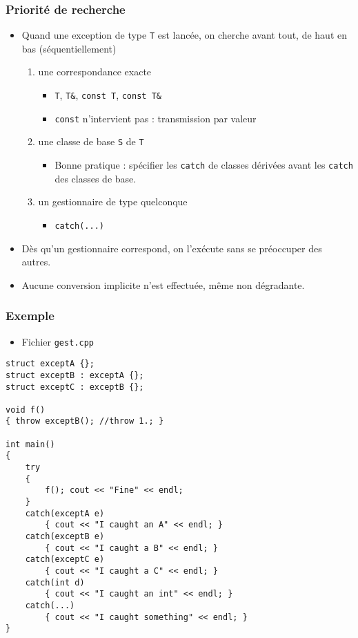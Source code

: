 \begin{frame}
\frametitle{Priorité de recherche}
\begin{itemize}[<+->]
\item Quand une exception de type \texttt{T} est lancée, on cherche avant tout, de haut en bas (séquentiellement)
	\begin{enumerate}
	\item une correspondance exacte
		\begin{itemize}
		\item \lstinline|T|, \lstinline|T&|, \lstinline|const T|, \lstinline|const T&|
		\item \lstinline|const| n'intervient pas : transmission par valeur
		\end{itemize}
	\item une classe de base \texttt{S} de \texttt{T}
		\begin{itemize}
		\item Bonne pratique : spécifier les \lstinline|catch| de classes dérivées avant les \lstinline|catch| des classes de base.
		\end{itemize}	
	\item un gestionnaire de type quelconque
		\begin{itemize}
		\item \lstinline|catch(...)|
		\end{itemize}
	\end{enumerate}
\item Dès qu'un gestionnaire correspond, on l'exécute sans se préoccuper des autres.
\item Aucune conversion implicite n'est effectuée, même non dégradante.
\end{itemize}
\end{frame}

\begin{frame}[containsverbatim]
\frametitle{Exemple}
\begin{itemize}
\item Fichier \texttt{gest.cpp}
\end{itemize}
\begin{lstlisting}
struct exceptA {};                                                      
struct exceptB : exceptA {};                                            
struct exceptC : exceptB {};                                            

void f()
{ throw exceptB(); //throw 1.; }

int main()
{
	try             
	{
		f(); cout << "Fine" << endl;
	}
	catch(exceptA e)
		{ cout << "I caught an A" << endl; }
	catch(exceptB e)
		{ cout << "I caught a B" << endl; }
	catch(exceptC e)
		{ cout << "I caught a C" << endl; }
	catch(int d)
		{ cout << "I caught an int" << endl; }
	catch(...)
		{ cout << "I caught something" << endl; }
}
\end{lstlisting}
\end{frame}

